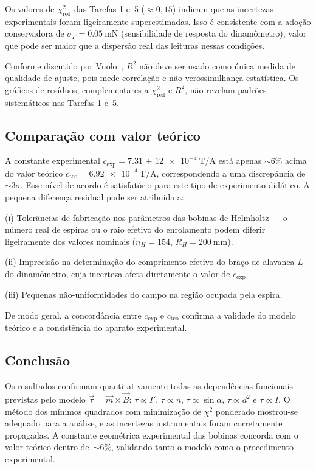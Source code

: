 \documentclass[aps, twocolumn, superscriptaddress, floatfix, nofootinbib]{revtex4-2}
\begin{document}
Os valores de $\chi^2_{\text{red}}$ das Tarefas 1 e~5 ($\approx 0{,}15$)
indicam que as incertezas experimentais foram ligeiramente superestimadas. Isso
é consistente com a adoção conservadora de
$\sigma_F=\SI{0,05}{\milli\newton}$ (sensibilidade de resposta do
dinamômetro), valor que pode ser maior que a dispersão real das leituras nessas
condições.

Conforme discutido por Vuolo~\cite{Vuolo}, $R^2$ não deve ser usado como única
medida de qualidade de ajuste, pois mede correlação e não verossimilhança
estatística. Os gráficos de resíduos, complementares a $\chi^2_\text{red}$ e
$R^2$, não revelam padrões sistemáticos nas Tarefas 1 e~5.

\subsection{Comparação com valor teórico}

A constante experimental $c_\text{exp}=\SI{7,31(12)e-4}{\tesla\per\ampere}$
está apenas $\sim 6\%$ acima do valor teórico
$c_\text{teo}=\SI{6,92e-4}{\tesla\per\ampere}$, correspondendo a uma
discrepância de $\sim 3\sigma$. Esse nível de acordo é satisfatório para este
tipo de experimento didático. A pequena diferença residual pode ser atribuída a:

(i) Tolerâncias de fabricação nos parâmetros das bobinas de Helmholtz --- o
número real de espiras ou o raio efetivo do enrolamento podem diferir
ligeiramente dos valores nominais ($n_H=154$, $R_H=\SI{200}{\milli\metre}$).

(ii) Imprecisão na determinação do comprimento efetivo do braço de alavanca
$L$ do dinamômetro, cuja incerteza afeta diretamente o valor de $c_\text{exp}$.

(iii) Pequenas não-uniformidades do campo na região ocupada pela espira.

De modo geral, a concordância entre $c_\text{exp}$ e $c_\text{teo}$ confirma a
validade do modelo teórico e a consistência do aparato experimental.

\subsection{Conclusão}

Os resultados confirmam quantitativamente todas as dependências funcionais
previstas pelo modelo $\vec{\tau}=\vec{m}\times\vec{B}$: $\tau\propto I'$,
$\tau\propto n$, $\tau\propto\sin\alpha$, $\tau\propto d^2$ e $\tau\propto I$.
O método dos mínimos quadrados com minimização de $\chi^2$ ponderado mostrou-se
adequado para a análise, e as incertezas instrumentais foram corretamente
propagadas. A constante geométrica experimental das bobinas concorda com o
valor teórico dentro de~$\sim 6\%$, validando tanto o modelo como o
procedimento experimental.
\end{document}
